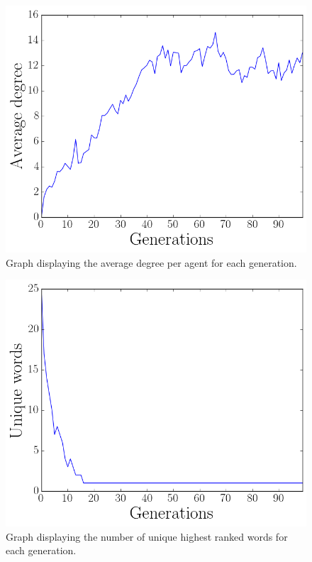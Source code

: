 \begin{figure}[htbp]
    \centering
    \includegraphics[scale=0.5]{fig/Results/Exp2/Degree1}
    \caption{Graph displaying the average degree per agent for each generation.}
    \label{fig:Degree2}
\end{figure}
\begin{figure}[htbp]
    \centering
    \includegraphics[scale=0.5]{fig/Results/Exp2/UniqueWords1}
    \caption{Graph displaying the number of unique highest ranked words for each generation.}
    \label{fig:UniqueWords2}
\end{figure}
